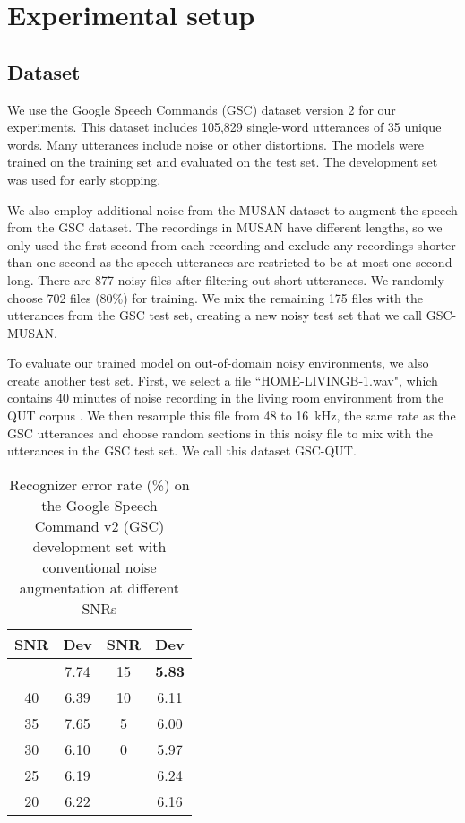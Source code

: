 \documentclass{article}
\begin{document}
\section{Experimental setup}
\subsection{Dataset}
We use the Google Speech Commands (GSC) dataset version 2 \cite{warden2018speech} for our experiments. This dataset includes 105,829 single-word utterances of 35 unique words. Many utterances include noise or other distortions. The models were trained on the training set and evaluated on the test set. The development set was used for early stopping. 

We also employ additional noise from the MUSAN dataset \cite{snyder2015musan} to augment the speech from the GSC dataset. The recordings in MUSAN have different lengths, so we only used the first second from each recording and exclude any recordings shorter than one second as the speech utterances are restricted to be at most one second long. There are 877 noisy files after filtering out short utterances. We randomly choose 702 files (80\%) for training. We mix the remaining 175 files with the utterances from the GSC test set, creating a new noisy test set that we call GSC-MUSAN. 

To evaluate our trained model on out-of-domain noisy environments, we also create another test set. First, we select a file ``HOME-LIVINGB-1.wav", which contains 40 minutes of noise recording in the living room environment from the QUT corpus \cite{dean2015qut}. We then resample this file from 48 to 16~kHz, the same rate as the GSC utterances and choose random sections in this noisy file to mix with the utterances in the GSC test set. We call this dataset GSC-QUT.




\begin{table}
  \caption{Recognizer error rate (\%) on the Google Speech Command v2 (GSC) development set with conventional noise augmentation at different SNRs}
  \label{tab:importantAug_result1}
  
  \begin{center}
\begin{tabular}{cc@{}cc}
  \toprule
  SNR & Dev  & SNR & Dev  \\
  \midrule
   & 7.74 & 15 & \textbf{5.83} \\  
  40 & 6.39 & 10 & 6.11 \\
  35 & 7.65 & 5 & 6.00 \\
  30 & 6.10 & 0 & 5.97 \\
  25 & 6.19 &  & 6.24 \\
  20 & 6.22 &   & 6.16 \\
  \bottomrule
    \end{tabular}
  \end{center}
\end{table}
\end{document}
